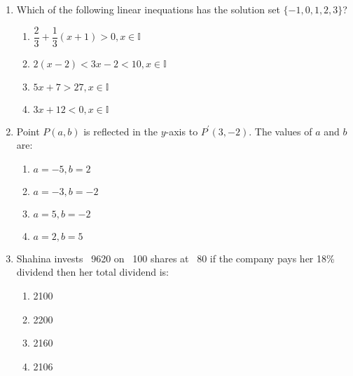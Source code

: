 \begin{enumerate}[label=(\roman*)]

    \item Which of the following linear inequations has the solution set 
        $\{-1, 0, 1, 2, 3 \}$?

        \begin{enumerate}[label=(\alph*)]
            \item $\dfrac23 + \dfrac13 (x+1) > 0, x \in \mathbb{I}$
            \item $2(x-2) < 3x-2 < 10 , x \in \mathbb{I}$
            \item $5x + 7 > 27, x \in \mathbb{I}$
            \item $3x + 12 < 0, x \in \mathbb{I}$
        \end{enumerate}

    \newpage
    \item Point $P(a,b)$ is reflected in the $y$-axis to $P^{\prime}(3, -2)$. 
        The values of $a$ and $b$ are:

        \begin{multicols}{2}
        \begin{enumerate}[label=(\alph*)]
            \item $a=-5, b=2$
            \item $a=-3, b=-2$
            \item $a=5, b=-2$
            \item $a=2, b=5$
        \end{enumerate}
        \end{multicols}

    \item Shahina invests \rupee~9620 on \rupee~100 shares at \rupee~80 if 
        the company pays her 18\% dividend then her total dividend is:

        \begin{multicols}{2}
        \begin{enumerate}[label=(\alph*)]
            \item 2100
            \item 2200
            \item 2160
            \item 2106
        \end{enumerate}
        \end{multicols}


\end{enumerate}

